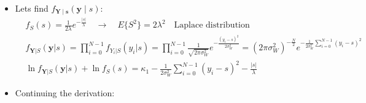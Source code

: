 \begin{itemize}
\item Lets find \(f_{\mathbf{Y\mid s}}({\mathbf{y}\mid s})\):
\begin{align*}
&f_S(s) = \frac{1}{2\lambda} e^{-\frac{|s|}{\lambda}} \quad \rightarrow \quad E\{S^2\} = 2\lambda^2 \quad \text{Laplace distribution} \\[8pt]
&f_{\mathbf{Y}|S}(\mathbf{y}|s) = \prod_{i=0}^{N-1} f_{Y_i|S}(y_i|s) = \prod_{i=0}^{N-1} \frac{1}{\sqrt{2\pi\sigma_W^2}} e^{-\frac{(y_i - s)^2}{2\sigma_W^2}} 
= \left( 2\pi\sigma_W^2 \right)^{-\frac{N}{2}} e^{-\frac{1}{2\sigma_W^2} \sum_{i=0}^{N-1} (y_i - s)^2} \\[8pt]
&\ln f_{\mathbf{Y}|S}(\mathbf{y}|s) + \ln f_S(s) = \kappa_1 - \frac{1}{2\sigma_W^2} \sum_{i=0}^{N-1} (y_i - s)^2 - \frac{|s|}{\lambda}
\end{align*}
\item Continuing the derivation:


\end{itemize}
